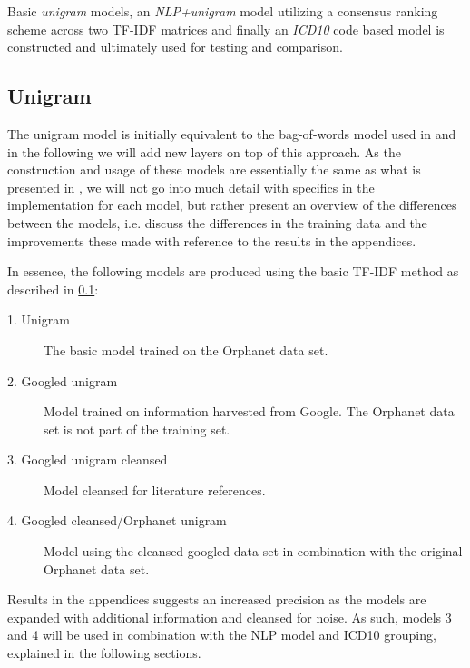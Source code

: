 \documentclass[10pt,letterpaper,final]{article}
\begin{document}
Basic \textit{unigram} models, an \textit{NLP+unigram} model utilizing a
consensus ranking scheme across two TF-IDF matrices and finally an
\textit{ICD10} code based model is constructed and ultimately used for
testing and comparison.


\subsection{Unigram}
\label{chap:unigrammethod}
The unigram model is initially equivalent to the bag-of-words model used in
\cite{jensenandersen} and in the following we will add new layers on top of this
approach. As the construction and usage of these models are essentially
the same as what is presented in \cite{jensenandersen}, we will not go
into much detail with specifics in the implementation for each model,
but rather present an overview of the differences between the models,
i.e. discuss the differences in the training data and the improvements
these made with reference to the results in the appendices.

In essence, the following models are produced using the basic TF-IDF
method as described in \ref{chap:unigrammethod}:

\begin{description}
\item[1. Unigram] The basic model trained on the Orphanet data set.
\item[2. Googled unigram] Model trained on information harvested from
Google. The Orphanet data set is not part of the training set.
\item[3. Googled unigram cleansed] Model cleansed for literature
references.
\item[4. Googled cleansed/Orphanet unigram] Model using the cleansed
googled data set in combination with the original Orphanet data set.
\end{description}

Results in the appendices suggests an increased precision as the models
are expanded with additional information and cleansed for noise. As such, models 3
and 4 will be used in combination with the NLP model and ICD10 grouping,
explained in the following sections.
\end{document}
